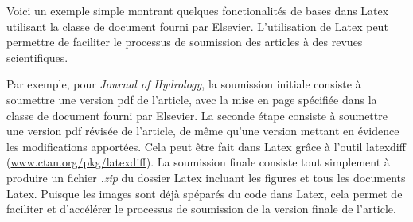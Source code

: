 \documentclass[Master.tex]{subfiles}
\begin{document}
Voici un exemple simple montrant quelques fonctionalités de bases dans Latex utilisant la classe de document fourni par Elsevier. L'utilisation de Latex peut permettre de faciliter le processus de soumission des articles à des revues scientifiques.

Par exemple, pour \emph{Journal of Hydrology}, la soumission initiale consiste à soumettre une version pdf de l'article, avec la mise en page spécifiée dans la classe de document fourni par Elsevier. La seconde étape consiste à soumettre une version pdf révisée de l'article, de même qu'une version mettant en évidence les modifications apportées. Cela peut être fait dans Latex grâce à l'outil latexdiff (\url{www.ctan.org/pkg/latexdiff}). La soumission finale consiste tout simplement à produire un fichier \emph{.zip} du dossier Latex incluant les figures et tous les documents Latex. Puisque les images sont déjà spéparés du code dans Latex, cela permet de faciliter et d'accélérer le processus de soumission de la version finale de l'article.
\end{document}
